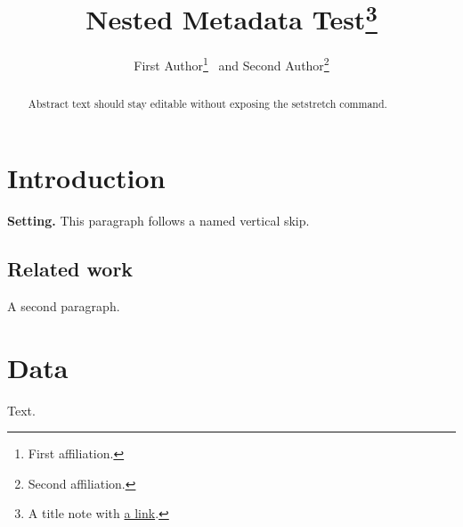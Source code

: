 \documentclass{article}
\begin{document}
\title{Nested Metadata Test\thanks{A title note with \protect\href{https://example.com}{a link}.}}
\author{First Author\thanks{First affiliation.} ~and Second Author\thanks{Second affiliation.}}
\date{}
\maketitle

\begin{abstract}
Abstract text should stay editable without exposing the setstretch command.
\end{abstract}

\pagebreak{}

\section{Introduction\label{sec:introduction}}
\medskip{}
\noindent \textbf{Setting.} This paragraph follows a named vertical skip.

\subsection{Related work}\label{sec:related}
\bigskip{}
A second paragraph.

\section{Data\label{sec:data}}
Text.
\end{document}
